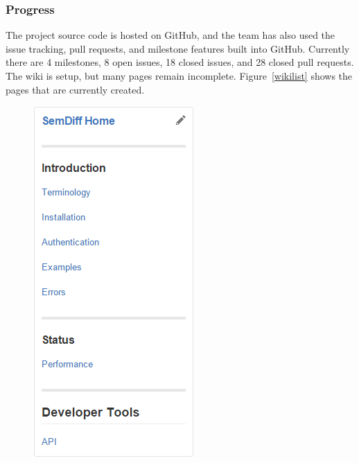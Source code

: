 \documentclass[draftclsnofoot,onecolumn]{IEEEtran}
\begin{document}
\subsubsection{Progress}
The project source code is hosted on GitHub, and the team has also used the 
issue tracking, pull requests, and milestone features built into GitHub. 
Currently there are 4 milestones, 8 open issues, 18 closed issues, and 28 
closed pull requests. The wiki is setup, but many pages remain incomplete. 
Figure~\ref{wikilist} shows the pages that are currently created.

\begin{figure}[!t]
\centering
\includegraphics[width=\textwidth]{WikiList}

\end{figure}
\end{document}
